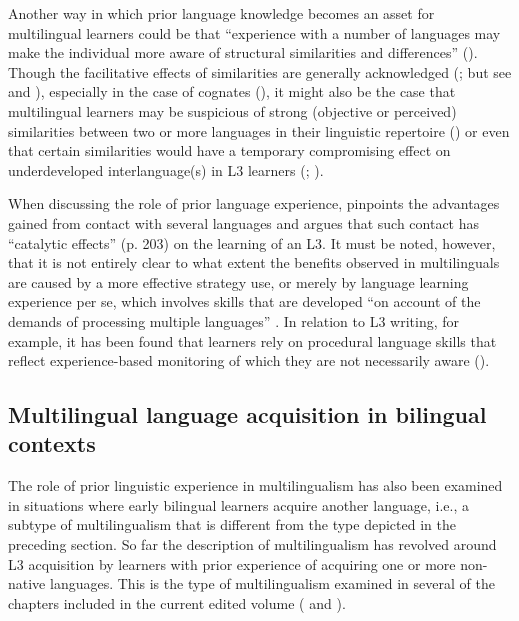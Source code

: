 \documentclass[output=paper,colorlinks,citecolor=brown,nonflat]{langsci/langscibook}
\begin{document}
Another way in which prior language knowledge becomes an asset for multilingual learners could be that “experience with a number of languages may make the individual more aware of structural similarities and differences” (\citealt[11]{McLaughlinNayak1989}). Though the facilitative effects of similarities are generally acknowledged (\citealt{Ringbom2007, RutgersEvans2017}; but see \citealt{SwainEtAl1990} and \citealt{GibsonEtAl2001}), especially in the case of cognates (), it might also be the case that multilingual learners may be suspicious of strong (objective or perceived) similarities between two or more languages in their linguistic repertoire (\citealt{Fouser2001, OtwinowskaSzewczyk2017}) or even that certain similarities would have a temporary compromising effect on underdeveloped interlanguage(s) in L3 learners (\citealt{BardelFalk2007, Rast2010, Sánchez2012}; ).

When discussing the role of prior language experience, \citet{Jessner1999} pinpoints the advantages gained from contact with several languages and argues that such contact has “catalytic effects” (p. 203) on the learning of an L3. It must be noted, however, that it is not entirely clear to what extent the benefits observed in multilinguals are caused by a more effective strategy use, or merely by language learning experience per se, which involves skills that are developed “on account of the demands of processing multiple languages” \citep[243]{Kemp2007}. In relation to L3 writing, for example, it has been found that learners rely on procedural language skills that reflect experience-based monitoring of which they are not necessarily aware (\citealt{RutgersEvans2017}).

\subsection{Multilingual language acquisition in bilingual contexts}\label{sec:sanchez1:1.2}

The role of prior linguistic experience in multilingualism has also been examined in situations where early bilingual learners acquire another language, i.e., a subtype of multilingualism that is different from the type depicted in the preceding section. So far the description of multilingualism has revolved around L3 acquisition by learners with prior experience of acquiring one or more non-native languages. This is the type of multilingualism examined in several of the chapters included in the current edited volume (\citeauthor{chapters/gudmundson, chapters/salaberry, chapters/sanchez7, chapters/sciutti} and \citeauthor{chapters/stadt}).
\end{document}
